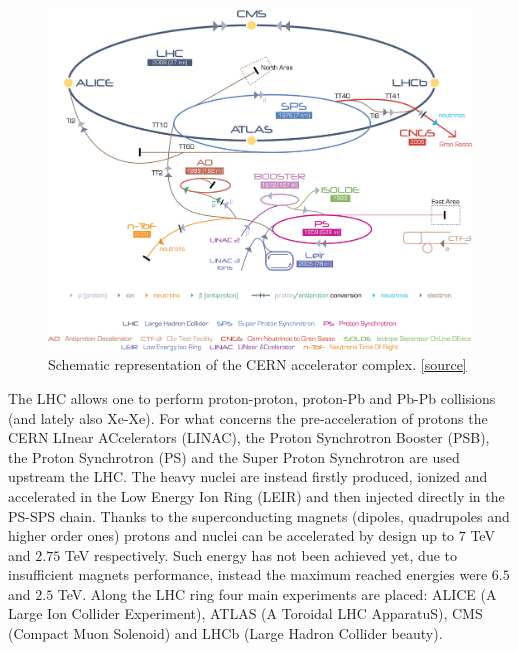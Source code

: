 \begin{figure}[!t]
\begin{center}
\includegraphics[width=\linewidth]{Chapters/Introduction/Figs/Cern-Accelerator-Complex.pdf}
\caption{Schematic representation of the CERN accelerator complex. \href{https://www.researchgate.net/publication/325961875_DEVELOPMENT_AND_EVALUATION_OF_NOVEL_LARGE_AREA_RADIATION_HARD_SILICON_MICROSTRIP_SENSORS_FOR_THE_ATLAS_ITk_EXPERIMENT_AT_THE_HL-LHC}{[source]}}
\label{fig:accelerators}
\end{center}
\end{figure}

The LHC allows one to perform proton-proton, proton-Pb and Pb-Pb collisions (and lately also Xe-Xe).
For what concerns the pre-acceleration of protons the CERN LInear ACcelerators (LINAC), the Proton Synchrotron Booster (PSB), the Proton Synchrotron (PS) and the Super Proton Synchrotron are used upstream the LHC.
The heavy nuclei are instead firstly produced, ionized and accelerated in the Low Energy Ion Ring (LEIR) and then injected directly in the PS-SPS chain.
Thanks to the superconducting magnets (dipoles, quadrupoles and higher order ones) protons and nuclei can be accelerated by design up to $7$ TeV and $2.75$ TeV respectively.
Such energy has not been achieved yet, due to insufficient magnets performance, instead the maximum reached energies were $6.5$ and $2.5$ TeV.
Along the LHC ring four main experiments are placed: ALICE (A Large Ion Collider Experiment),  ATLAS (A Toroidal LHC ApparatuS), CMS (Compact Muon Solenoid) and LHCb (Large Hadron Collider beauty).

